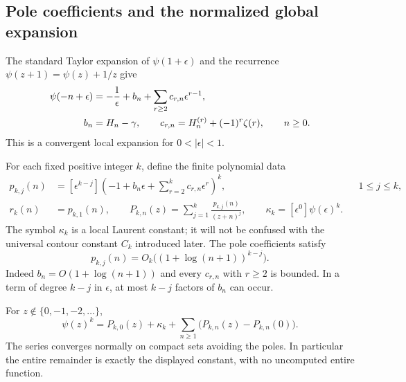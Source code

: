 \subsection{Pole coefficients and the normalized global expansion}

The standard Taylor expansion of $\psi(1+\epsilon)$ and the recurrence
$\psi(z+1)=\psi(z)+1/z$ give \cite[\S\S5.5,5.7]{dgp:DLMF}
\begin{align}
 \psi(-n+\epsilon)
 &=-\frac1\epsilon+b_n+
                 \sum_{r\ge2}c_{r,n}\epsilon^{r-1},
 \label{dgp:eq:pole-series}\\
 b_n&=H_n-\gamma,\qquad
 c_{r,n}=H_n^{(r)}+(-1)^r\zeta(r),\qquad n\ge0.
 \notag
\end{align}
This is a convergent local expansion for $0<|\epsilon|<1$.

For each fixed positive integer $k$, define the finite polynomial data
\begin{align}
 p_{k,j}(n)
 &=[\epsilon^{k-j}]
   \left(-1+b_n\epsilon+\sum_{r=2}^k c_{r,n}\epsilon^r\right)^k,
      &&1\le j\le k, \label{dgp:eq:pdef}\\
 r_k(n)&=p_{k,1}(n),\qquad
 P_{k,n}(z)=\sum_{j=1}^k\frac{p_{k,j}(n)}{(z+n)^j},
 \qquad
 \kappa_k=[\epsilon^0]\psi(\epsilon)^k.
 \label{dgp:eq:Pdef}
\end{align}
The symbol $\kappa_k$ is a local Laurent constant; it will not be
confused with the universal contour constant $C_k$ introduced later.
The pole coefficients satisfy
\begin{equation}
 p_{k,j}(n)=O_k\bigl((1+\log(n+1))^{k-j}\bigr).
 \label{dgp:eq:p-growth}
\end{equation}
Indeed $b_n=O(1+\log(n+1))$ and every $c_{r,n}$ with $r\ge2$ is
bounded.  In a term of degree $k-j$ in $\epsilon$, at most $k-j$
factors of $b_n$ can occur.

\begin{theorem}
\label{dgp:thm:ML}
For $z\notin\{0,-1,-2,\ldots\}$,
\begin{equation}
 \boxed{\;
 \psi(z)^k=P_{k,0}(z)+\kappa_k+
       \sum_{n\ge1}\bigl(P_{k,n}(z)-P_{k,n}(0)\bigr).
 \;}
 \label{dgp:eq:ML}
\end{equation}
The series converges normally on compact sets avoiding the poles.
In particular the entire remainder is exactly the displayed constant,
with no uncomputed entire function.
\end{theorem}

